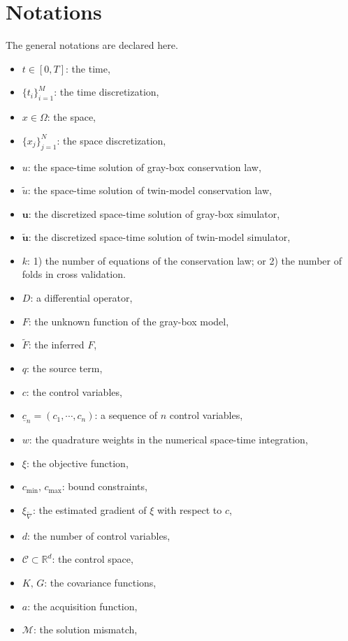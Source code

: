 \section{Notations}
The general notations are declared here.
\begin{itemize}
    \item $t\in [0,T]$: the time,
    \item $\{t_i\}_{i=1}^M$: the time discretization,
    \item $x\in \Omega$: the space,
    \item $\{x_j\}_{j=1}^N$: the space discretization,
    \item $u$: the space-time solution of gray-box conservation law,
    \item $\tilde{u}$: the space-time solution of twin-model conservation law,
    \item $\boldsymbol{u}$: the discretized space-time solution of gray-box simulator,
    \item $\tilde{\boldsymbol{u}}$: the discretized space-time solution of twin-model simulator,
    \item $k$: 1) the number of equations of the conservation law; or 2) the number of folds in 
               cross validation.
    \item $D$: a differential operator,
    \item $F$: the unknown function of the gray-box model,
    \item $\tilde{F}$: the inferred $F$,
    \item $q$: the source term,
    \item $c$: the control variables,
    \item $\underline{c}_n=(c_1, \cdots, c_n)$: a sequence of $n$ control variables,
    \item $w$: the quadrature weights in the numerical space-time integration,
    \item $\xi$: the objective function,
    \item $c_{\min}, \, c_{\max}$: bound constraints,
    \item $\xi_{\tilde{\nabla}}$: the estimated gradient of $\xi$ with respect to $c$,
    \item $d$: the number of control variables,
    \item $\mathcal{C}\subset \mathbb{R}^d$: the control space,
    \item $K,\, G$: the covariance functions,
    \item $a$: the acquisition function,
    \item $\mathcal{M}$: the solution mismatch,

\end{itemize}
